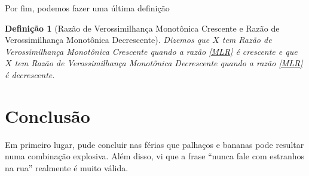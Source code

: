 \documentclass{article}
\newtheorem{definition}{Definição}
\begin{document}
Por fim, podemos fazer uma última definição
\begin{definition}[Razão de Verossimilhança Monotônica Crescente e Razão de Verossimilhança Monotônica Decrescente]
    Dizemos que $X$ tem Razão de Verossimilhança Monotônica Crescente quando a razão \ref{MLR} é crescente e que $X$ tem Razão de Verossimilhança Monotônica Decrescente quando a razão \ref{MLR} é decrescente.
\end{definition}












\section*{Conclusão}

Em primeiro lugar, pude concluir nas férias que palhaços e bananas pode resultar numa combinação explosiva. Além disso, vi que a frase ``nunca fale com estranhos na rua'' realmente é muito válida.

\begin{comment}
Já no início pudemos ter uma boa ideia do significado da precisão, sendo visualizada como uma métrica de proximidade dos dados em relação a média. Após isso passamos a fazer uma análise bayesiana com a normal com média e precisão desconhecidas. Feita a análise, descobrimos mais uma família conjugada, agora com duas distribuições a priori. Além disso, a visualização de $\lambda_0$ como um nível de certeza a priori acabou deixando o cálculo da média a posteriori, $\mu_1$, um pouco mais intuitivo. Além dele, vimos que $\alpha_0$ e $\beta_0$ são hiperparâmetros que irão contribuir na forma da posteriori de $\mu$, ditando a concentração em torno de $\mu_1$.

Chegando no exemplo vimos que a escolha da priori tem certa relevância no cálculo da posteriori, embora os intervalos de credibilidade que foram gerados ficaram próximos. Além disso, vimos que a medida em que $n$ cresce essa relevância  da priori diminui. Ou seja, a priori pode ser gerada de diversas formas, a depender da interpretação de quem vai elaborá-la, mas a posteriori nos dará resultados similares e, com uma grande amostragem, as posterioris tendem a uma mesma distribuição.

Assim, uma das maiores lições desse trabalho é que elicitar prioris pode ser muito complicado, podendo ser considerada uma arte na qual o ponto de vista e interpretação do artista pode ser crucial para obtermos um resultado razoável ou então um totalmente descartável.

Por fim, talvez seria interessante alguém falar com Palmirinha para ela buscar um assistente menos comilão, imagine ele fazendo uma amostragem de $100$ pamonhas!

\end{comment}

\printbibliography
\end{document}
